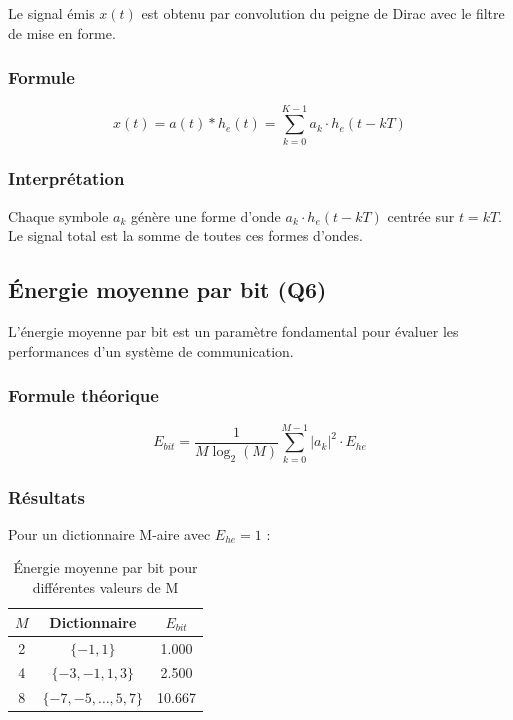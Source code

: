 \documentclass[12pt,a4paper]{article}
\begin{document}
Le signal émis $x(t)$ est obtenu par convolution du peigne de Dirac avec le filtre de mise en forme.

\subsubsection{Formule}

\begin{equation}
    x(t) = a(t) * h_e(t) = \sum_{k=0}^{K-1} a_k \cdot h_e(t - kT)
\end{equation}

\subsubsection{Interprétation}

Chaque symbole $a_k$ génère une forme d'onde $a_k \cdot h_e(t - kT)$ centrée sur $t = kT$. Le signal total est la somme de toutes ces formes d'ondes.

\subsection{Énergie moyenne par bit (Q6)}

L'énergie moyenne par bit est un paramètre fondamental pour évaluer les performances d'un système de communication.

\subsubsection{Formule théorique}

\begin{equation}
    E_{bit} = \frac{1}{M \log_2(M)} \sum_{k=0}^{M-1} |a_k|^2 \cdot E_{he}
\end{equation}

\subsubsection{Résultats}

Pour un dictionnaire M-aire avec $E_{he} = 1$ :

\begin{table}[H]
\centering
\begin{tabular}{|c|c|c|}
\hline
$M$ & Dictionnaire & $E_{bit}$ \\
\hline
2 & $\{-1, 1\}$ & 1.000 \\
4 & $\{-3, -1, 1, 3\}$ & 2.500 \\
8 & $\{-7, -5, \ldots, 5, 7\}$ & 10.667 \\
\hline
\end{tabular}
\caption{Énergie moyenne par bit pour différentes valeurs de M}
\end{table}
\end{document}
